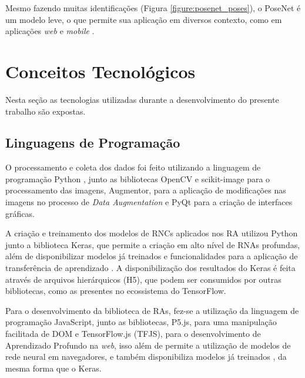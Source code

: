 
\par Mesmo fazendo muitas identificações (Figura \ref{figure:posenet_poses}), o PoseNet é um modelo leve, o que permite sua aplicação em diversos contexto, como em aplicações \textit{web} e \textit{mobile} \cite{PoseNetMedium2019}.

\section{Conceitos Tecnológicos}

Nesta seção as tecnologias utilizadas durante a desenvolvimento do presente trabalho são expostas.

\subsection{Linguagens de Programação}

\par O processamento e coleta dos dados foi feito utilizando a linguagem de programação Python \cite{Python2019}, junto as bibliotecas OpenCV e scikit-image para o processamento das imagens, Augmentor, para a aplicação de modificações nas imagens no processo de \textit{Data Augmentation} e PyQt para a criação de interfaces gráficas.

\par A criação e treinamento dos modelos de RNCs aplicados nos RA utilizou Python junto a biblioteca Keras, que permite a criação em alto nível de RNAs profundas, além de disponibilizar modelos já treinados e funcionalidades para a aplicação de transferência de aprendizado \cite{chollet2015}. A disponibilização dos resultados do Keras é feita através de arquivos hierárquicos (H5), que podem ser consumidos por outras bibliotecas, como as presentes no ecossistema do TensorFlow.

\par Para o desenvolvimento da biblioteca de RAs, fez-se a utilização da linguagem de programação JavaScript, junto as bibliotecas, P5.js, para uma manipulação facilitada de DOM e TensorFlow.js (TFJS), para o desenvolvimento de Aprendizado Profundo na \textit{web}, isso além de permite a utilização de modelos de rede neural em navegadores, e também disponibiliza modelos já treinados \cite{tensorflowjs2019}, da mesma forma que o Keras.

